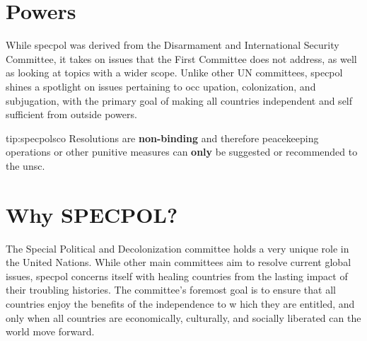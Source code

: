 \section{Powers}
While \acrshort{specpol} was derived from the Disarmament and 
International Security Committee, it takes on issues that the First Committee does not address, as 
well as looking at topics with a wider scope.
Unlike other UN committees, \acrshort{specpol}
shines a spotlight on issues pertaining to occ
upation, colonization, and subjugation, with the primary goal of making all countries independent and self
sufficient from outside powers.

\begin{tip}{tip:specpolsco}
Resolutions are \textbf{non-binding} and therefore peacekeeping operations or other punitive measures can \textbf{only} be suggested or recommended to the \acrfull{unsc}.
\end{tip}

\section{Why SPECPOL?}
The Special Political and Decolonization committee holds a very unique role in the United Nations. 
While other main committees aim to resolve current global issues, \acrshort{specpol} concerns itself with 
healing countries from the lasting impact of their troubling histories. The committee’s foremost goal is to ensure that all countries enjoy the benefits of the independence to w
hich they are entitled, and only when all countries are economically, culturally, and socially liberated can the world move forward.
